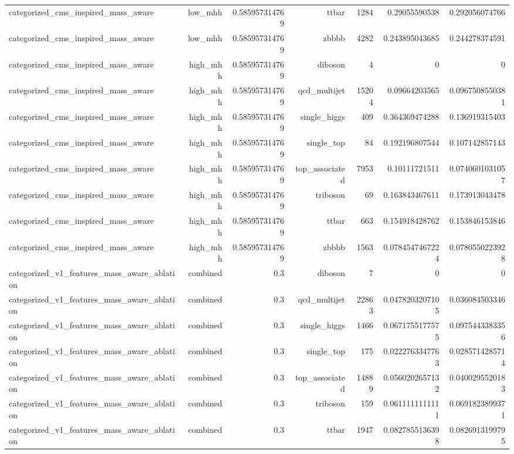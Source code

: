 \begin{table}[htbp]
{\begin{tabular}{lrrrrrr}
categorized\_cms\_inspired\_mass\_aware & low\_mhh & 0.585957314769 & ttbar & 1284 & 0.29055590538 & 0.292056074766 \\
categorized\_cms\_inspired\_mass\_aware & low\_mhh & 0.585957314769 & zbbbb & 4282 & 0.243895043685 & 0.244278374591 \\
categorized\_cms\_inspired\_mass\_aware & high\_mhh & 0.585957314769 & diboson & 4 & 0 & 0 \\
categorized\_cms\_inspired\_mass\_aware & high\_mhh & 0.585957314769 & qcd\_multijet & 15204 & 0.09664203565 & 0.0967508550381 \\
categorized\_cms\_inspired\_mass\_aware & high\_mhh & 0.585957314769 & single\_higgs & 409 & 0.364369474288 & 0.136919315403 \\
categorized\_cms\_inspired\_mass\_aware & high\_mhh & 0.585957314769 & single\_top & 84 & 0.192196807544 & 0.107142857143 \\
categorized\_cms\_inspired\_mass\_aware & high\_mhh & 0.585957314769 & top\_associated & 7953 & 0.10111721511 & 0.0740601031057 \\
categorized\_cms\_inspired\_mass\_aware & high\_mhh & 0.585957314769 & triboson & 69 & 0.163843467611 & 0.173913043478 \\
categorized\_cms\_inspired\_mass\_aware & high\_mhh & 0.585957314769 & ttbar & 663 & 0.154918428762 & 0.153846153846 \\
categorized\_cms\_inspired\_mass\_aware & high\_mhh & 0.585957314769 & zbbbb & 1563 & 0.0784547467224 & 0.0780550223928 \\
categorized\_v1\_features\_mass\_aware\_ablation & combined & 0.3 & diboson & 7 & 0 & 0 \\
categorized\_v1\_features\_mass\_aware\_ablation & combined & 0.3 & qcd\_multijet & 22863 & 0.0478203207105 & 0.036084503346 \\
categorized\_v1\_features\_mass\_aware\_ablation & combined & 0.3 & single\_higgs & 1466 & 0.0671755177575 & 0.0975443383356 \\
categorized\_v1\_features\_mass\_aware\_ablation & combined & 0.3 & single\_top & 175 & 0.0222763347763 & 0.0285714285714 \\
categorized\_v1\_features\_mass\_aware\_ablation & combined & 0.3 & top\_associated & 14889 & 0.0560202657132 & 0.0400295520183 \\
categorized\_v1\_features\_mass\_aware\_ablation & combined & 0.3 & triboson & 159 & 0.0611111111111 & 0.0691823899371 \\
categorized\_v1\_features\_mass\_aware\_ablation & combined & 0.3 & ttbar & 1947 & 0.0827855136398 & 0.0826913199795 \\

\end{tabular}}
\end{table}
